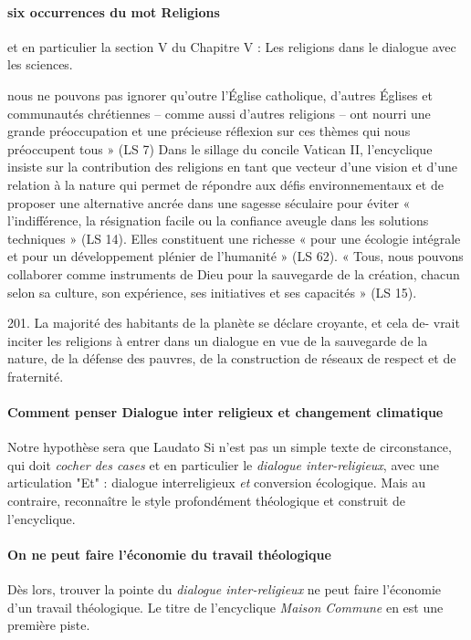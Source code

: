 \paragraph{six occurrences du mot Religions} et en particulier la section V du Chapitre V : Les religions dans le dialogue avec les sciences.
\begin{singlequote}
     nous ne pouvons pas ignorer qu’outre l’Église catholique, d’autres Églises et communautés chrétiennes – comme aussi d’autres religions – ont nourri une grande préoccupation et une précieuse réflexion sur ces thèmes qui nous préoccupent tous » (LS 7)
        Dans le sillage du concile Vatican II, l’encyclique insiste sur la contribution des religions en tant que vecteur d’une vision et d’une relation à la nature qui permet de répondre aux défis environnementaux et de proposer une alternative ancrée dans une sagesse séculaire pour éviter « l’indifférence, la résignation facile ou la confiance aveugle dans les solutions techniques » (LS 14). Elles constituent une richesse « pour une écologie intégrale et pour un développement plénier de l’humanité » (LS 62).  « Tous, nous pouvons collaborer comme instruments de Dieu pour la sauvegarde de la création, chacun selon sa culture, son expérience, ses initiatives et ses capacités » (LS 15).  \cite{francois_laudato_2015}
\end{singlequote}
\begin{singlequote}
    201. La majorité des habitants de la planète se déclare croyante, et cela de-
vrait inciter les religions à entrer dans un dialogue en vue de la sauvegarde de
la nature, de la défense des pauvres, de la construction de réseaux de respect
et de fraternité. 
\end{singlequote}
 
 



\paragraph{Comment penser Dialogue inter religieux et changement climatique} Notre hypothèse sera que Laudato Si n'est pas un simple texte de circonstance, qui doit \textit{cocher des cases} et en particulier le \textit{dialogue inter-religieux}, avec une articulation "Et" : dialogue interreligieux \textit{et} conversion écologique. Mais au contraire, reconnaître le style profondément théologique et construit de l'encyclique. 

\paragraph{On ne peut faire l'économie du travail théologique}
Dès lors, trouver la pointe du \textit{dialogue inter-religieux} ne peut faire l'économie d'un travail théologique. Le titre de l'encyclique \textit{Maison Commune} en est une première piste.

